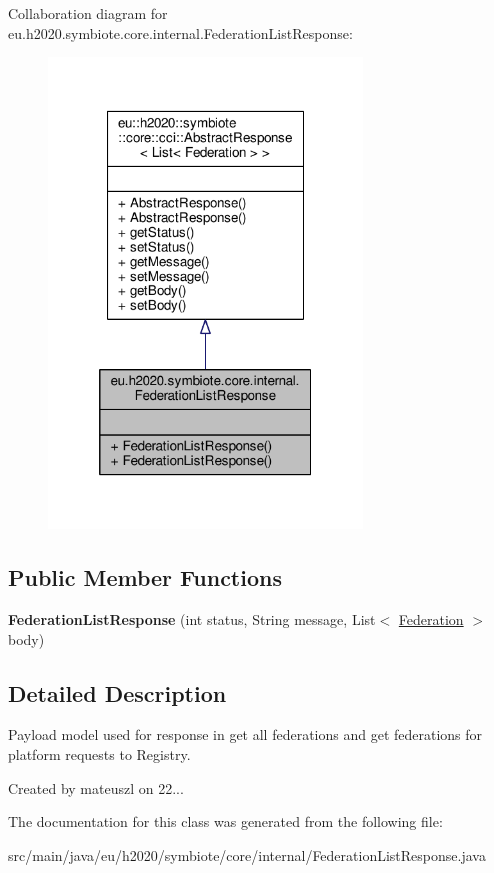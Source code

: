 Collaboration diagram for eu.\+h2020.\+symbiote.\+core.\+internal.\+Federation\+List\+Response\+:\nopagebreak
\begin{figure}[H]
\begin{center}
\leavevmode
\includegraphics[width=236pt]{classeu_1_1h2020_1_1symbiote_1_1core_1_1internal_1_1FederationListResponse__coll__graph}
\end{center}
\end{figure}
\subsection*{Public Member Functions}
\begin{DoxyCompactItemize}
\item 
\mbox{\label{classeu_1_1h2020_1_1symbiote_1_1core_1_1internal_1_1FederationListResponse_aea0813a485ee25a6fdba57ede896dcb9}} 
{\bfseries Federation\+List\+Response} (int status, String message, List$<$ \hyperlink{classeu_1_1h2020_1_1symbiote_1_1model_1_1mim_1_1Federation}{Federation} $>$ body)
\end{DoxyCompactItemize}


\subsection{Detailed Description}
Payload model used for response in \textquotesingle{}get all federations\textquotesingle{} and \textquotesingle{}get federations for platform\textquotesingle{} requests to Registry.

Created by mateuszl on 22... 

The documentation for this class was generated from the following file\+:\begin{DoxyCompactItemize}
\item 
src/main/java/eu/h2020/symbiote/core/internal/Federation\+List\+Response.\+java\end{DoxyCompactItemize}
